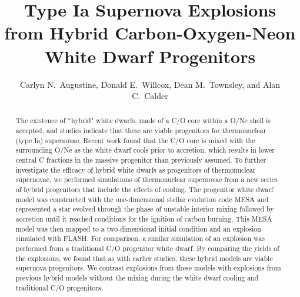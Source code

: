 \documentclass[iop,apj]{emulateapj}
\begin{document}
\title{Type Ia Supernova Explosions from Hybrid Carbon-Oxygen-Neon White Dwarf Progenitors}

\author{
Carlyn N.\ Augustine,
Donald E.\ Willcox,
Dean M.\ Townsley,
and Alan C.\ Calder
}


\begin{abstract}
The existence of ``hybrid" white dwarfs, made of a C/O
core within a O/Ne shell is accepted, and studies indicate that these are 
viable progenitors for thermonuclear (type Ia) supernovae.
Recent work found that the C/O core is mixed with the surrounding O/Ne
as the white dwarf cools prior to accretion, which results in lower central 
C fractions in the massive progenitor than previously assumed. To further 
investigate the efficacy of hybrid white dwarfs as progenitors of 
thermonuclear supernovae, we performed simulations of thermonuclear 
supernovae from a new series of hybrid progenitors that include the 
effects of cooling. The progenitor white dwarf model
was constructed with the one-dimensional stellar evolution code MESA and
represented a star evolved through the phase of unstable interior mixing 
followed by accretion until it reached conditions for the ignition of 
carbon burning. This MESA model was then mapped to a two-dimensional initial 
condition and an explosion simulated with FLASH. For comparison, a similar
simulation of an explosion was performed from a traditional C/O progenitor
white dwarf. By comparing the yields of the explosions, we found that as
with earlier studies, these hybrid models are viable supernova progenitors.
We contrast explosions from these models with explosions 
from previous hybrid models 
{\color{red} without the mixing during the white dwarf cooling}
and traditional C/O progenitors.
\end{abstract}

\end{document}
